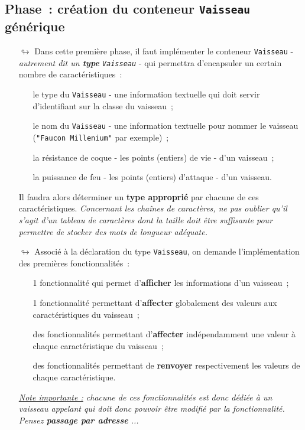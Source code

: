 \documentclass[10pt, fleqn, a4paper]{article}
\newcommand{\itcolor}[2]{\textcolor{#1}{\textit{#2}}}
\newcounter{quest}
\begin{document}
\addtocounter{quest}{1}
\subsection*{Phase~\thequest : création du conteneur \texttt{Vaisseau} générique}
\label{phase_vaisseau}

\begin{itemize}
\item[$\looparrowright$] Dans cette première phase, il faut implémenter le \og{}conteneur\fg{} \texttt{Vaisseau} - \itcolor{redCM}{autrement dit un \textbf{type} \textnormal{\texttt{Vaisseau}}} - qui permettra d'encapsuler un certain nombre de caractéristiques~:
\begin{itemize}
\item[\ding{223}] le type du \texttt{Vaisseau} - une information textuelle qui doit servir d'identifiant sur la classe du vaisseau~;
\item[\ding{223}] le nom du \texttt{Vaisseau} - une information textuelle pour nommer le vaisseau (\texttt{"Faucon Millenium"} par exemple)~;
\item[\ding{223}] la résistance de coque - les \og{}points (entiers) de vie\fg{} - d'un vaisseau~;
\item[\ding{223}] la puissance de feu - les \og{}points (entiers) d'attaque\fg{} - d'un vaisseau.
\end{itemize}

Il faudra alors déterminer un \textbf{type approprié} par chacune de ces caractéristiques. \textit{Concernant les chaînes de caractères, ne pas oublier qu'il s'agit d'un tableau de caractères dont la taille doit être suffisante pour permettre de \og{}stocker\fg{} des mots de longueur adéquate.}

\item[$\looparrowright$] Associé à la déclaration du type \texttt{Vaisseau}, on demande l'implémentation des premières fonctionnalités~:

\begin{itemize}
\item[\ding{223}] 1 fonctionnalité qui permet d’\textbf{afficher} les informations d'un vaisseau~;
\item[\ding{223}] 1 fonctionnalité permettant d'\textbf{affecter} globalement des valeurs aux caractéristiques du vaisseau~;
\item[\ding{223}] des fonctionnalités permettant d'\textbf{affecter} indépendamment une valeur à chaque caractéristique du vaisseau~;
\item[\ding{223}] des fonctionnalités permettant de \textbf{renvoyer} respectivement les valeurs de chaque caractéristique.
\end{itemize}

\itcolor{redCM}{\underline{Note importante :} chacune de ces fonctionnalités est donc dédiée à un vaisseau \og{}appelant\fg{} qui doit donc pouvoir être modifié par la fonctionnalité. Pensez \textbf{\og{}passage par adresse\fg{}} ...}
\end{itemize}
\end{document}
